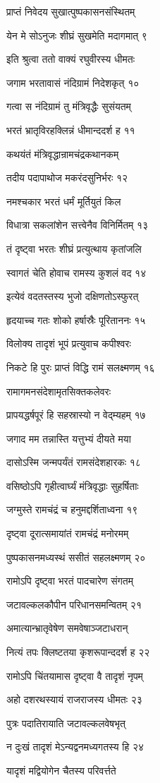 प्राप्तं निवेदय सुखात्पुष्पकासनसंस्थितम्

येन मे सोऽनुजः शीघ्रं सुखमेति मदागमात् ९

इति श्रुत्वा ततो वाक्यं रघुवीरस्य धीमतः

जगाम भरतावासं नंदिग्रामं निदेशकृत् १०

गत्वा स नंदिग्रामं तु मंत्रिवृद्धैः सुसंयतम्

भरतं भ्रातृविरहक्लिन्नं धीमान्ददर्श ह ११

कथयंतं मंत्रिवृद्धान्रामचंद्रकथानकम्

तदीय पदापाथोज मकरंदसुनिर्भरः १२

नमश्चकार भरतं धर्मं मूर्तियुतं किल

विधात्रा सकलांशेन सत्त्वेनैव विनिर्मितम् १३

तं दृष्ट्वा भरतः शीघ्रं प्रत्युत्थाय कृतांजलि

स्वागतं चेति होवाच रामस्य कुशलं वद १४

इत्येवं वदतस्तस्य भुजो दक्षिणतोऽस्फुरत्

हृदयाच्च गतः शोको हर्षास्रैः पूरिताननः १५

विलोक्य तादृशं भूपं प्रत्युवाच कपीश्वरः

निकटे हि पुरः प्राप्तं विद्धि रामं सलक्ष्मणम् १६

रामागमनसंदेशामृतसिक्तकलेवरः

प्रापयद्धर्षपूरं हि सहस्रास्यो न वेद्म्यहम् १७

जगाद मम तन्नास्ति यत्तुभ्यं दीयते मया

दासोऽस्मि जन्मपर्यंतं रामसंदेशहारकः १८

वसिष्ठोऽपि गृहीत्वार्घ्यं मंत्रिवृद्धाः सुहर्षिताः

जग्मुस्ते रामचंद्रं च हनुमद्दर्शिताध्वना १९

दृष्ट्वा दूरात्समायांतं रामचंद्रं मनोरमम्

पुष्पकासनमध्यस्थं ससीतं सहलक्ष्मणम् २०

रामोऽपि दृष्ट्वा भरतं पादचारेण संगतम्

जटावल्कलकौपीन परिधानसमन्वितम् २१

अमात्यान्भ्रातृवेषेण समवेषाञ्जटाधरान्

नित्यं तपः क्लिष्टतया कृशरूपान्ददर्श ह २२

रामोऽपि चिंतयामास दृष्ट्वा वै तादृशं नृपम्

अहो दशरथस्यायं राजराजस्य धीमतः २३

पुत्रः पदातिरायाति जटावल्कलवेषभृत्

न दुःखं तादृशं मेऽन्यद्वनमध्यगतस्य हि २४

यादृशं मद्वियोगेन चैतस्य परिवर्त्तते

